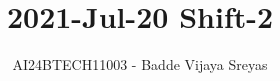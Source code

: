 \documentclass[journal,9pt,onecolumn]{IEEEtran}
\begin{document}

\vspace{3cm}

\title{2021-Jul-20 Shift-2}
\author{AI24BTECH11003 - Badde Vijaya Sreyas}
{\let\newpage\relax\maketitle}

\renewcommand{\thefigure}{\theenumi}
\renewcommand{\thetable}{\theenumi}
\setlength{\intextsep}{10pt} %


\renewcommand{\thetable}{\theenumi}
\end{document}
